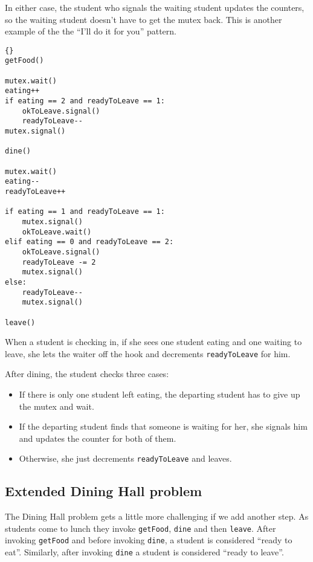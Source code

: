 \documentclass{book}
\begin{document}
In either case, the student who signals the waiting student
updates the counters, so the waiting student doesn't have
to get the mutex back.  This is another example of the
the ``I'll do it for you'' pattern.

\begin{lstlisting}[title={Dining Hall problem solution}]{}
getFood()

mutex.wait()
eating++
if eating == 2 and readyToLeave == 1:
    okToLeave.signal()
    readyToLeave--
mutex.signal()

dine()

mutex.wait()
eating--
readyToLeave++

if eating == 1 and readyToLeave == 1:
    mutex.signal()
    okToLeave.wait()
elif eating == 0 and readyToLeave == 2:
    okToLeave.signal()
    readyToLeave -= 2
    mutex.signal()
else:
    readyToLeave--
    mutex.signal()

leave()
\end{lstlisting}

When a student is checking in, if she sees one student
eating and one waiting to leave, she lets the waiter off the
hook and decrements {\tt readyToLeave} for him.

\newpage
After dining, the student checks three cases:

\begin{itemize}

\item If there is only one student left eating, the departing student
has to give up the mutex and wait.

\item If the departing student finds that someone is waiting for
her, she signals him and updates the counter for both of them.

\item Otherwise, she just decrements {\tt readyToLeave} and leaves.

\end{itemize}


\subsection{Extended Dining Hall problem}

The Dining Hall problem gets a little more challenging if we
add another step.  As students come to lunch they
invoke {\tt getFood}, {\tt dine} and then {\tt leave}.
After invoking {\tt getFood} and before invoking {\tt dine},
a student is considered ``ready to eat''.  Similarly, after
invoking {\tt dine} a student is considered ``ready to leave''.
\end{document}
